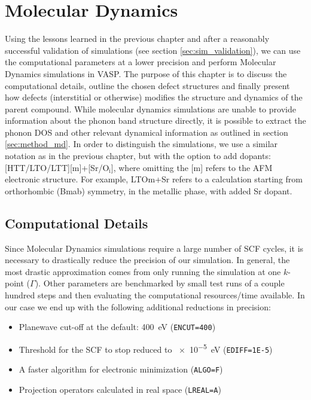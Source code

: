 \chapter{Molecular Dynamics}\label{ch:md}
Using the lessons learned in the previous chapter and after a reasonably successful validation of simulations (see section \ref{sec:sim_validation}), we can use the computational parameters at a lower precision and perform Molecular Dynamics simulations in VASP. The purpose of this chapter is to discuss the computational details, outline the chosen defect structures and finally present how defects (interstitial or otherwise) modifies the structure and dynamics of the parent compound. While molecular dynamics simulations are unable to provide information about the phonon band structure directly, it is possible to extract the phonon DOS and other relevant dynamical information as outlined in section \ref{sec:method_md}. In order to distinguish the simulations, we use a similar notation as in the previous chapter, but with the option to add dopants: [HTT/LTO/LTT][m]+[Sr/O$_\text{i}$], where omitting the [m] refers to the AFM electronic structure. For example, LTOm+Sr refers to a calculation starting from orthorhombic (Bmab) symmetry, in the metallic phase, with added Sr dopant.

\section{Computational Details}
Since Molecular Dynamics simulations require a large number of SCF cycles, it is necessary to drastically reduce the precision of our simulation. In general, the most drastic approximation comes from only running the simulation at one $k$-point ($\Gamma$). Other parameters are benchmarked by small test runs of a couple hundred steps and then evaluating the computational resources/time available. In our case we end up with the following additional reductions in precision:

\begin{itemize}
	\item Planewave cut-off at the default: \SI{400}{\eV} (\texttt{ENCUT=400})
	\item Threshold for the SCF to stop reduced to \SI{e-5}{\eV} (\texttt{EDIFF=1E-5})
	\item A faster algorithm for electronic minimization (\texttt{ALGO=F})
	\item Projection operators calculated in real space (\texttt{LREAL=A})
\end{itemize}

